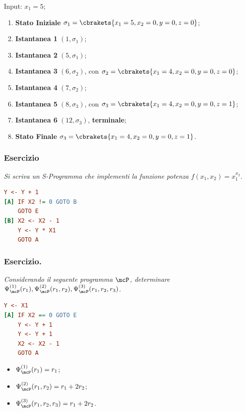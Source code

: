 Input: \(x_1=5\);

\begin{enumerate}
    \item \textbf{Stato Iniziale} \(\sigma_1=\cbrakets{x_1=5, x_2=0,y=0,z=0}\);
    \item \textbf{Istantanea 1} \((1,\sigma_1)\);
    \item \textbf{Istantanea 2} \((5,\sigma_1)\);
    \item \textbf{Istantanea 3} \((6,\sigma_2)\), con \(\sigma_2=\cbrakets{x_1=4,x_2=0,y=0,z=0}\);
    \item \textbf{Istantanea 4} \((7,\sigma_2)\);
    \item \textbf{Istantanea 5} \((8,\sigma_3)\), con \(\sigma_3=\cbrakets{x_1=4,x_2=0,y=0,z=1}\);
    \item \textbf{Istantanea 6} \((12,\sigma_3)\), \textbf{terminale};
    \item \textbf{Stato Finale} \(\sigma_3=\cbrakets{x_1=4,x_2=0,y=0,z=1}\).
\end{enumerate}

\subsubsection*{Esercizio} \textit{Si scriva un S-Programma che implementi la funzione potenza \(f(x_1,x_2)=x_1^{x_2}\)}.

\begin{lstlisting}[language=ini, label={Funzione Potenza},  caption=Funzione potenza]
    Y <- Y + 1
[A] IF X2 != 0 GOTO B
    GOTO E
[B] X2 <- X2 - 1
    Y <- Y * X1
    GOTO A
\end{lstlisting}

\subsubsection*{Esercizio.} \textit{Considerando il seguente programma \(\mcP\), determinare \(\Psi_{\mcP}^{(1)}(r_1), \Psi_{\mcP}^{(2)}(r_1,r_2), \Psi_{\mcP}^{(3)}(r_1,r_2,r_3)\)}.

\begin{lstlisting}[language=ini, label={Programma P},  caption=Programma P]
    Y <- X1
[A] IF X2 == 0 GOTO E
    Y <- Y + 1
    Y <- Y + 1
    X2 <- X2 - 1
    GOTO A
\end{lstlisting}

\begin{itemize}
    \item \(\Psi_{\mcP}^{(1)}(r_1)=r_1\);
    \item \(\Psi_{\mcP}^{(2)}(r_1,r_2)=r_1+2r_2\);
    \item \(\Psi_{\mcP}^{(3)}(r_1,r_2,r_3)=r_1+2r_2\).
\end{itemize}

